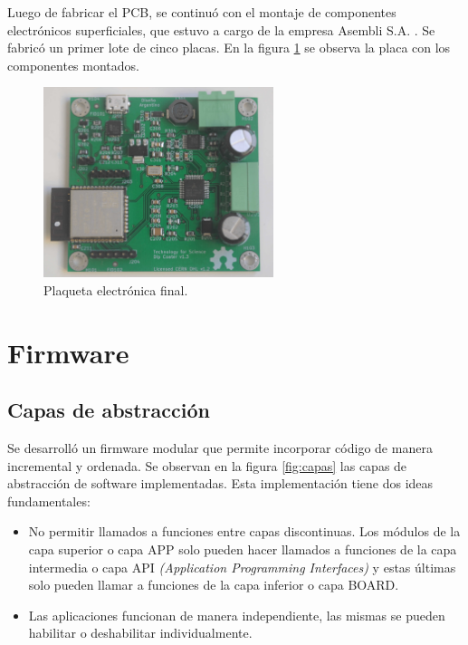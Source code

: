 Luego de fabricar el PCB, se continuó con el montaje de componentes electrónicos superficiales, que estuvo a cargo de la empresa Asembli S.A. \citep{web_asembli}. Se fabricó un primer lote de cinco placas. En la figura \ref{fig:dip_real_model} se observa la placa con los componentes montados.


\begin{figure}[htbp]
	\centering
	\includegraphics[width=0.6\textwidth]{./Figures/dip_real_model.jpg}
	\caption{Plaqueta electrónica final.}
	\label{fig:dip_real_model}
\end{figure}


\section{Firmware}
\subsection{Capas de abstracción}

Se desarrolló un firmware modular que permite incorporar código de manera incremental y ordenada. Se observan en la figura \ref{fig:capas} las capas de abstracción de software implementadas. Esta implementación tiene dos ideas fundamentales:

\begin{itemize}
\item No permitir llamados a funciones entre capas discontinuas. Los módulos de la capa superior o capa APP solo pueden hacer llamados a funciones de la capa intermedia o capa API \textit{(Application Programming Interfaces)} y estas últimas solo pueden llamar a funciones de la capa inferior o capa BOARD.
\item Las aplicaciones funcionan de manera independiente, las mismas se pueden habilitar o deshabilitar individualmente.
\end{itemize}

